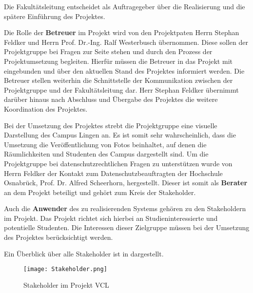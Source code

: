 Die Fakultätsleitung entscheidet als Auftragegeber über die Realisierung und
die spätere Einführung des Projektes.

Die Rolle der \textbf{Betreuer} im Projekt wird von den Projektpaten Herrn Stephan
Feldker und Herrn Prof. Dr.-Ing. Ralf Westerbusch übernommen. Diese sollen der
Projektgruppe bei Fragen zur Seite stehen und durch den Prozess der
Projektumsetzung begleiten. Hierfür müssen die Betreuer in das Projekt mit
eingebunden und über den aktuellen Stand des Projektes informiert werden. Die
Betreuer stellen weiterhin die Schnittstelle der Kommunikation zwischen der
Projektgruppe und der Fakultätsleitung dar. Herr Stephan Feldker übernimmt
darüber hinaus nach Abschluss und Übergabe des Projektes die weitere Koordination des Projektes.

Bei der Umsetzung des Projektes strebt die Projektgruppe eine visuelle
Darstellung des Campus Lingen an. Es ist somit sehr wahrscheinlich, dass die
Umsetzung die Veröffentlichung von Fotos beinhaltet, auf denen die
Räumlichkeiten und Studenten des Campus dargestellt sind. Um die Projektgruppe
bei datenschutzrechtlichen Fragen zu unterstützen wurde von Herrn Feldker der
Kontakt zum Datenschutzbeauftragten der Hochschule Osnabrück, Prof. Dr. Alfred
Scheerhorn, hergestellt. Dieser ist somit als \textbf{Berater} an dem Projekt beteiligt
und gehört zum Kreis der Stakeholder.

Auch die \textbf{Anwender} des zu realisierenden Systems gehören zu den Stakeholdern im
Projekt. Das Projekt richtet sich hierbei an Studieninteressierte und potentielle
Studenten. Die Interessen dieser Zielgruppe müssen bei der Umsetzung des
Projektes berücksichtigt werden.

\clearpage

Ein Überblick über alle Stakeholder ist in  dargestellt.

\begin{figure}[htb] 
\centering
\texttt{[image: Stakeholder.png]}
\caption[Stakeholder im Projekt \acs{VCL}]{Stakeholder im Projekt \acs{VCL}\protect\footnotemark}
\label{fig:Stakeholder}
\end{figure}
